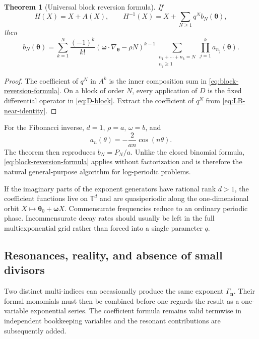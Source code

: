 \documentclass[11pt,oneside]{article}
\numberwithin{equation}{section}
\newtheorem{theorem}{Theorem}[section]
\newcommand{\TT}{\mathbb{T}}
\newcommand{\vct}[1]{\boldsymbol{#1}}
\begin{document}
\begin{theorem}[Universal block reversion formula]
\label{thm:block-reversion}
If
\begin{equation}
  H(X)=X+A(X),
  \qquad
  H^{-1}(X)=X+\sum_{N\ge1}q^Nb_N(\vct\theta),
\end{equation}
then
\begin{equation}
 \boxed{
 b_N(\vct\theta)=
 \sum_{k=1}^{N}\frac{(-1)^k}{k!}
 \left(\vct\omega\cdot\nabla_{\vct\theta}-\rho N\right)^{k-1}
 \sum_{\substack{n_1+\cdots+n_k=N\\n_j\ge1}}
 \prod_{j=1}^k a_{n_j}(\vct\theta).
 }
 \label{eq:block-reversion-formula}
\end{equation}
\end{theorem}

\begin{proof}
The coefficient of \(q^N\) in \(A^k\) is the inner composition sum in
\cref{eq:block-reversion-formula}.  On a block of order \(N\), every
application of \(D\) is the fixed differential operator in
\cref{eq:D-block}.  Extract the coefficient of \(q^N\) from
\cref{eq:LB-near-identity}.
\end{proof}

For the Fibonacci inverse, \(d=1\), \(\rho=a\), \(\omega=b\), and
\begin{equation}
  a_n(\theta)=-\frac{2}{an}\cos(n\theta).
  \label{eq:Fibonacci-a-n}
\end{equation}
The theorem then reproduces \(b_N=P_N/a\).  Unlike the closed binomial formula,
\cref{eq:block-reversion-formula} applies without factorization and is therefore
the natural general-purpose algorithm for log-periodic problems.

If the imaginary parts of the exponent generators have rational rank \(d>1\),
the coefficient functions live on \(\TT^d\) and are quasiperiodic along the
one-dimensional orbit \(X\mapsto\vct\theta_0+\vct\omega X\).  Commensurate
frequencies reduce to an ordinary periodic phase.  Incommensurate decay rates
should usually be left in the full multiexponential grid rather than forced into
a single parameter \(q\).

\subsection{Resonances, reality, and absence of small divisors}

Two distinct multi-indices can occasionally produce the same exponent
\(\Gamma_{\vct n}\).  Their formal monomials must then be combined before one
regards the result as a one-variable exponential series.  The coefficient
formula remains valid termwise in independent bookkeeping variables and the
resonant contributions are subsequently added.
\end{document}
